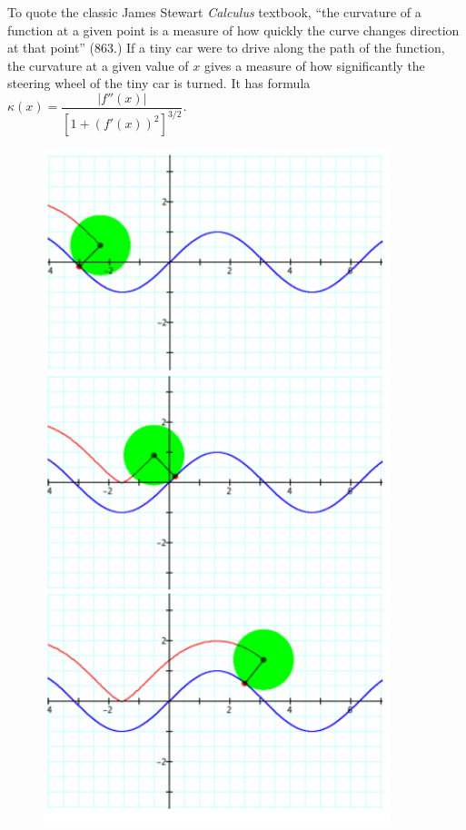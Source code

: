 To quote the classic James Stewart \textit{Calculus} textbook, ``the curvature of a function at a given point is a measure of how quickly the curve changes direction at that point'' (863.) If a tiny car were to drive along the path of the function, the curvature at a given value of $x$ gives a measure of how significantly the steering wheel of the tiny car is turned. It has formula $\kappa (x) = \dfrac{|f''(x)|}{[1 + (f'(x))^2]^{3/2}}$.

\begin{figure}[h!] 
  \label{crunch-1} 
  \begin{minipage}[b]{0.3\linewidth}
    \centering
    \includegraphics[width=0.9\textwidth, height=0.9\textheight, keepaspectratio]{findig-crunch-spots-img/Fig 18.png}

\end{minipage}
\end{figure}
